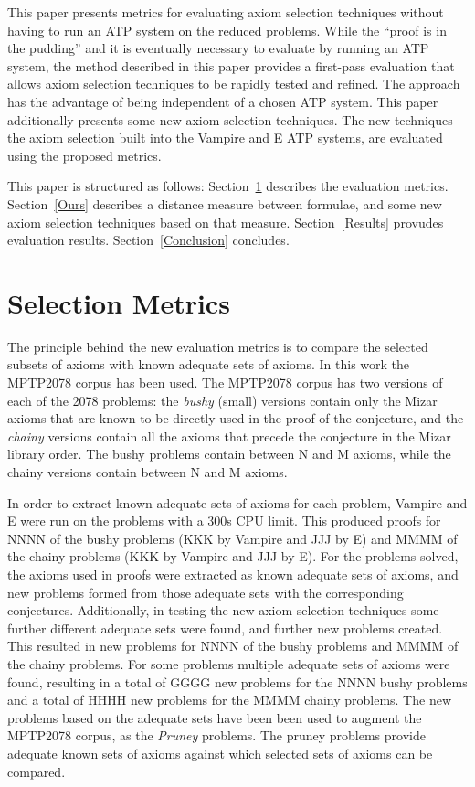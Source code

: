 \documentclass[EPiC]{easychair}
\begin{document}
This paper presents metrics for evaluating axiom selection techniques
without having to run an ATP system on the reduced problems.
While the ``proof is in the pudding'' and it is eventually necessary to
evaluate by running an ATP system, the method described in this paper
provides a first-pass evaluation that allows axiom selection techniques to
be rapidly tested and refined.
The approach has the advantage of being independent of a chosen ATP system.
This paper additionally presents some new axiom selection techniques. 
The new techniques the axiom selection built into the Vampire \cite{KV13} and 
E \cite{SCV19} ATP systems, are evaluated using the proposed metrics.

This paper is structured as follows:
Section~\ref{Metrics} describes the evaluation metrics.
Section~\ref{Ours} describes a distance measure between formulae, and
some new axiom selection techniques based on that measure.
Section~\ref{Results} provudes evaluation results.
Section~\ref{Conclusion} concludes.

\section{Selection Metrics}
\label{Metrics}

The principle behind the new evaluation metrics is to compare the selected
subsets of axioms with known adequate sets of axioms.
In this work the MPTP2078 corpus has been used.
The MPTP2078 corpus has two versions of each of the 2078 problems: 
the {\em bushy} (small) versions contain only the Mizar axioms that are
known to be directly used in the proof of the conjecture, and 
the {\em chainy} versions contain all the axioms that precede the conjecture
in the Mizar library order.
The bushy problems contain between N and M axioms, while the chainy versions
contain between N and M axioms.

In order to extract known adequate sets of axioms for each problem, Vampire
and E were run on the problems with a 300s CPU limit.
This produced proofs for NNNN of the bushy problems (KKK by Vampire and JJJ
by E) and MMMM of the chainy problems (KKK by Vampire and JJJ by E).
For the problems solved, the axioms used in proofs were extracted as
known adequate sets of axioms, and new problems formed from those adequate
sets with the corresponding conjectures.
Additionally, in testing the new axiom selection techniques some further
different adequate sets were found, and further new problems created.
This resulted in new problems for NNNN of the bushy problems and
MMMM of the chainy problems.
For some problems multiple adequate sets of axioms were found, resulting in
a total of GGGG new problems for the NNNN bushy problems and a total of
HHHH new problems for the MMMM chainy problems.
The new problems based on the adequate sets have been been used to augment
the MPTP2078 corpus, as the {\em Pruney} problems.
The pruney problems provide adequate known sets of axioms against which
selected sets of axioms can be compared.
\end{document}
